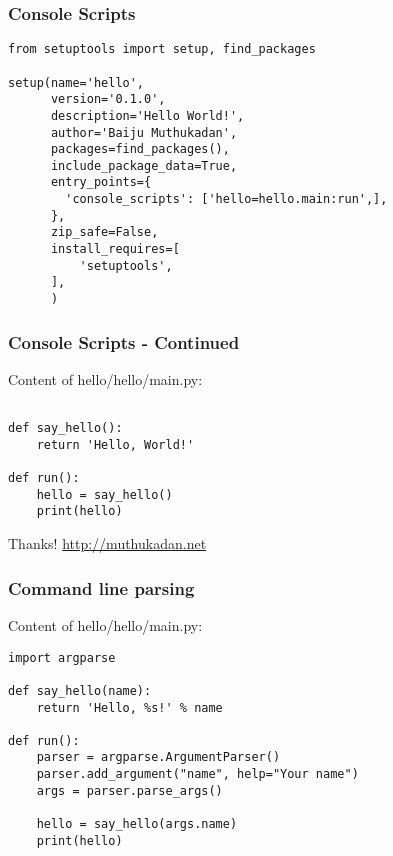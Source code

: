 \documentclass[12pt,handout]{beamer}
\begin{document}
\begin{frame}[fragile]
\frametitle{Console Scripts}

\small{
\begin{verbatim}
from setuptools import setup, find_packages

setup(name='hello',
      version='0.1.0',
      description='Hello World!',
      author='Baiju Muthukadan',
      packages=find_packages(),
      include_package_data=True,
      entry_points={
        'console_scripts': ['hello=hello.main:run',],
      },
      zip_safe=False,
      install_requires=[
          'setuptools',
      ],
      )
\end{verbatim}
}

\end{frame}

\begin{frame}[fragile]
\frametitle{Console Scripts - Continued}

Content of hello/hello/main.py:

\small{
\begin{verbatim}

def say_hello():
    return 'Hello, World!'

def run():
    hello = say_hello()
    print(hello)

\end{verbatim}
}

\end{frame}

\begin{frame}{Thanks!}
\center \url{http://muthukadan.net}
\end{frame}

\begin{frame}[fragile]
\frametitle{Command line parsing}

Content of hello/hello/main.py:

\small{
\begin{verbatim}
import argparse

def say_hello(name):
    return 'Hello, %s!' % name

def run():
    parser = argparse.ArgumentParser()
    parser.add_argument("name", help="Your name")
    args = parser.parse_args()

    hello = say_hello(args.name)
    print(hello)

\end{verbatim}
}

\end{frame}
\end{document}

